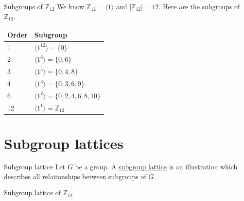 \documentclass[12pt]{article}
\newcommand{\Z}{\mathbb{Z}}
\begin{document}
	\begin{myex}{Subgroups of $\Z_12$}{}
		We know $\Z_{12}=\langle 1\rangle$ and $|\Z_{12}|=12$. Here are the subgroups of $\Z_{12}$.
		
		\begin{tabular}{|l|l|}
		\hline
		Order & Subgroup \\ \hline
		1     & $\langle 1^{12}\rangle=\{0\}$\\ \hline
		2     & $\langle 1^{6}\rangle=\{0, 6\}$\\ \hline
		3     & $\langle 1^{4}\rangle=\{0, 4, 8\}$\\ \hline
		4     & $\langle 1^{3}\rangle=\{0, 3, 6, 9\}$\\ \hline
		6     & $\langle 1^{2}\rangle=\{0, 2, 4, 6, 8, 10\}$\\ \hline
		12    & $\langle 1^{1}\rangle=\Z_{12}$\\ \hline
		\end{tabular}
	\end{myex}
	
	\section{Subgroup lattices}
	\begin{mydef}{Subgroup lattice}{}
		Let $G$ be a group. A \underline{subgroup lattice} is an illustration which describes all relationships between subgroups of $G$.
	\end{mydef}
	
	\begin{myex}{Subgroup lattice of $\Z_{12}$}{}
	\end{myex}
	
\end{document}
